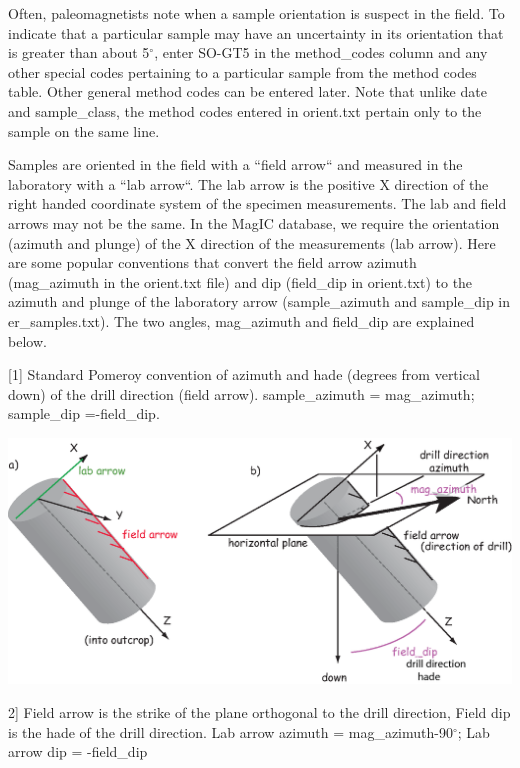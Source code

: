 \documentclass[11pt]{book}
\begin{document}
{Often, paleomagnetists note when a sample orientation is suspect in the field. To indicate that a particular sample may have an uncertainty in its orientation that is greater than about 5$^{\circ}$, enter SO-GT5 in the method\_codes column and any other special codes pertaining to a particular sample from the method codes table. Other general method codes can be entered later. Note that unlike date and sample\_class, the method codes entered in orient.txt pertain only to the sample on the same line.

Samples are oriented in the field with a ``field arrow`` and measured in the laboratory with a ``lab arrow``. The lab arrow is the positive X direction of the right handed coordinate system of the specimen measurements. The lab and field arrows may not be the same. In the MagIC database, we require the orientation (azimuth and plunge) of the X direction of the measurements (lab arrow). Here are some popular conventions that convert the field arrow azimuth (mag\_azimuth in the orient.txt file) and dip (field\_dip in orient.txt) to the azimuth and plunge of the laboratory arrow (sample\_azimuth and sample\_dip in er\_samples.txt). The two angles, mag\_azimuth and field\_dip are explained below.

{\parindent 0pt
[1] Standard Pomeroy convention of azimuth and hade (degrees from vertical down) of the drill direction (field arrow). sample\_azimuth = mag\_azimuth; sample\_dip =-field\_dip.

  \includegraphics[width=15cm]{EPSfiles/orcon_1.eps}

  2] Field arrow is the strike of the plane orthogonal to the drill direction, Field dip is the hade of the drill direction. Lab arrow azimuth = mag\_azimuth-90$^{\circ}$; Lab arrow dip = -field\_dip

}}
\end{document}
